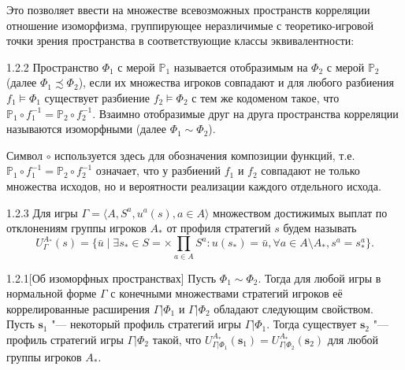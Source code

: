 Это позволяет ввести на множестве всевозможных пространств корреляции отношение изоморфизма, группирующее неразличимые с теоретико-игровой точки зрения пространства в соответствующие классы эквивалентности:

\begin{definition}{1.2.2}
	Пространство $\Phi_1$ с мерой $\mathbb{P}_1$ называется отобразимым на $\Phi_2$ с мерой $\mathbb{P}_2$ (далее $\Phi_1 \precsim \Phi_2$), если их множества игроков совпадают и для любого разбиения $f_1 \models \Phi_1$ существует разбиение $f_2 \models \Phi_2$ с тем же кодоменом такое, что $\mathbb{P}_1 \circ f_1^{-1} = \mathbb{P}_2 \circ f_2^{-1}$. Взаимно отобразимые друг на друга пространства корреляции называются изоморфными (далее $\Phi_1 \sim \Phi_2$).
\end{definition}

Символ $\circ$ используется здесь для обозначения композиции функций, т.е. $\mathbb{P}_1 \circ f_1^{-1} = \mathbb{P}_2 \circ f_2^{-1}$ означает, что у разбиений $f_1$ и $f_2$ совпадают не только множества исходов, но и вероятности реализации каждого отдельного исхода. 

\begin{definition}{1.2.3}
	Для игры $\Gamma = \langle A, S^a, u^a(s), a \in A \rangle$ множеством достижимых выплат по отклонениям группы игроков $A_*$ от профиля стратегий $s$ будем называть
	\begin{equation*}
		U_\Gamma^{A_*}(s) = \{\bar{u} \mid \exists s_* \in S = \times \prod_{a \in A} S^a : u(s_*) = \bar{u}, \forall a \in A \setminus A_*, s^a = s_*^a\}.
	\end{equation*}
\end{definition}

\begin{theorem}{1.2.1}[Об изоморфных пространствах]
	Пусть $\Phi_1 \sim \Phi_2$. Тогда для любой игры в нормальной форме $\Gamma$ с конечными множествами стратегий игроков её коррелированные расширения $\Gamma | \Phi_1$ и $\Gamma | \Phi_2$ обладают следующим свойством. Пусть $\mathbf{s}_1$ "--- некоторый профиль стратегий игры $\Gamma | \Phi_1$. Тогда существует $\mathbf{s}_2$ "--- профиль стратегий игры $\Gamma | \Phi_2$ такой, что $U_{\Gamma | \Phi_1}^{A_*}(\mathbf{s}_1) = U_{\Gamma | \Phi_2}^{A_*}(\mathbf{s}_2)$ для любой группы игроков $A_*$.
\end{theorem}

